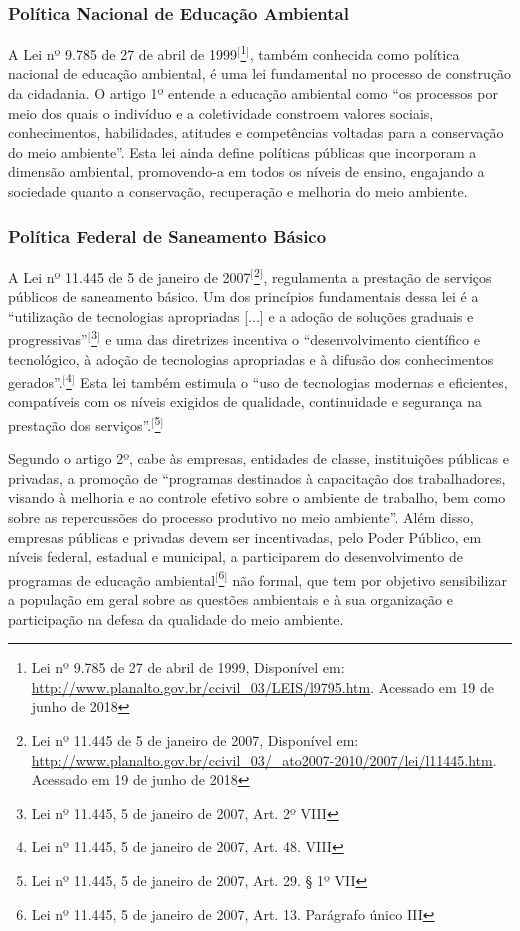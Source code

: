 \subsubsection{Política Nacional de Educação Ambiental} 

A Lei nº 9.785 de 27 de abril de 1999$^{[}$\footnote{Lei nº 9.785 de 27 de abril de 1999, Disponível em: \url{http://www.planalto.gov.br/ccivil_03/LEIS/l9795.htm}. Acessado em 19 de junho de 2018}$^{]}$, também conhecida como política nacional de educação ambiental, é uma lei fundamental no processo de construção da cidadania. O artigo 1º entende a educação ambiental como ``os processos por meio dos quais o indivíduo e a coletividade constroem valores sociais, conhecimentos, habilidades, atitudes e competências voltadas para a conservação do meio ambiente''. Esta lei ainda define políticas públicas que incorporam a dimensão  ambiental, promovendo-a em todos os níveis de ensino, engajando a sociedade quanto a conservação, recuperação e melhoria do meio ambiente.

\subsubsection{Política Federal de Saneamento Básico}

A Lei nº 11.445 de 5 de janeiro de 2007$^{[}$\footnote{Lei nº 11.445 de 5 de janeiro de 2007, Disponível em: \url{http://www.planalto.gov.br/ccivil_03/_ato2007-2010/2007/lei/l11445.htm}. Acessado em 19 de junho de 2018}$^{]}$, regulamenta a prestação de serviços públicos de saneamento básico. Um dos princípios fundamentais dessa lei é a ``utilização de tecnologias apropriadas [...] e a adoção de soluções graduais e progressivas''$^{[}$\footnote{Lei nº 11.445, 5 de janeiro de 2007, Art. 2º VIII}$^{]}$ e uma das diretrizes incentiva o ``desenvolvimento científico e tecnológico, à adoção de tecnologias apropriadas e à difusão dos conhecimentos gerados''.$^{[}$\footnote{Lei nº 11.445, 5 de janeiro de 2007, Art. 48. VIII}$^{]}$ Esta lei também estimula o ``uso de tecnologias modernas e eficientes, compatíveis com os níveis exigidos de qualidade, continuidade e segurança na prestação dos serviços''.$^{[}$\footnote{Lei nº 11.445, 5 de janeiro de 2007, Art. 29.  § 1º  VII}$^{]}$

Segundo o artigo 2º, cabe às empresas, entidades de classe, instituições públicas e privadas, a promoção de ``programas destinados à capacitação dos trabalhadores, visando à melhoria e ao controle efetivo sobre o ambiente de trabalho, bem como sobre as repercussões do processo produtivo no meio ambiente''. Além disso, empresas públicas e privadas devem ser incentivadas, pelo Poder Público, em níveis federal, estadual e municipal, a participarem do desenvolvimento de programas de educação ambiental$^{[}$\footnote{Lei nº 11.445, 5 de janeiro de 2007, Art. 13. Parágrafo único III}$^{]}$ não formal, que tem por objetivo sensibilizar a população em geral sobre as questões ambientais e à sua organização e participação na defesa da qualidade do meio ambiente.

